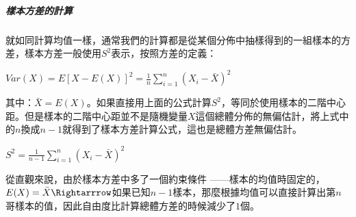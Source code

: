 \documentclass[11pt]{article}
\begin{document}
    \hypertarget{ux6a23ux672cux65b9ux5deeux7684ux8a08ux7b97}{%
\subparagraph{樣本方差的計算}\label{ux6a23ux672cux65b9ux5deeux7684ux8a08ux7b97}}

就如同計算均值一樣，通常我們的計算都是從某個分佈中抽樣得到的一組樣本的方差，樣本方差一般使用\(S^2\)表示，按照方差的定義：

\(Var(X) = E{[X - E(X)]^2} = \frac{1}{n} \displaystyle \sum_{i=1}^{n}(X_i - \bar{X})^2\)

其中：\(\bar{X} = E(X)\)。如果直接用上面的公式計算\(S^2\)，等同於使用樣本的二階中心距。但是樣本的二階中心距並不是隨機變量\(X\)這個總體分佈的無偏估計，將上式中的\(n\)換成\(n-1\)就得到了樣本方差計算公式，這也是總體方差無偏估計。

\(S^2 = \frac{1}{n - 1} \displaystyle \sum_{i=1}^{n}(X_i - \bar{X})^2\)

從直觀來說，由於樣本方差中多了一個約束條件
------樣本的均值時固定的，\(E(X) = \bar{X} \Rightarrrow\)如果已知\(n-1\)樣本，那麼根據均值可以直接計算出第\(n\)哥樣本的值，因此自由度比計算總體方差的時候減少了\(1\)個。
\end{document}
